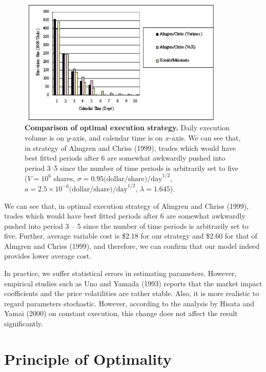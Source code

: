 \begin{figure}[htbp]
\begin{center}
 \includegraphics[width=10cm,height=6cm]{fg_b5n.png}
\end{center}
\caption[Comparison of optimal execution strategy.]{{\bf Comparison of optimal execution strategy.}
 \quad Daily execution volume is on $y$-axis, and calendar time is on $x$-axis.
 We can see that, in strategy of Almgren and Chriss (1999), trades which would have best fitted periods after 6 are
somewhat awkwardly pushed into period 3--5 since the number of time
 periods is arbitrarily set to five ($V=10^6$ shares, $\sigma=0.95\mbox{(dollar/share)/day}^{1/2}$, $a=2.5 \times 10^{-6} \mbox{(dollar/share)/day}^{1/2}$, $\lambda =1.645$).}\label{fg_b5}
\end{figure}

\noindent We can see that, in optimal execution strategy of Almgren and Chriss (1999), trades which would have best fitted periods after 6 are somewhat awkwardly pushed into period 3 -- 5 since the number of time periods is arbitrarily set to five.  Further, average variable cost is \$2.18 for our strategy and \$2.60 for that of Almgren and Chriss (1999), and therefore, we can confirm that our model indeed provides lower average cost.

In practice, we suffer statistical errors in estimating parameters.  However, empirical studies such as Uno and Yamada (1993) reports that the market impact coefficients and the price volatilities are rather stable.  Also, it is more realistic to regard parameters stochastic.  However, according to the analysis by Hisata and Yamai (2000) on constant execution, this change does not affect the result significantly.


\section{Principle of Optimality}\label{sec_b5}

